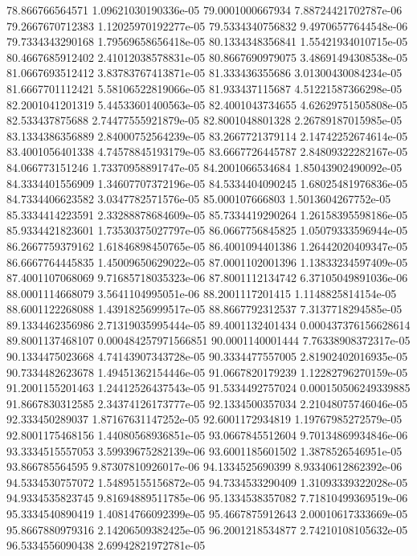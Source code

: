 {78.866766564571 1.09621030190336e-05
79.0001000667934 7.88724421702787e-06
79.2667670712383 1.12025970192277e-05
79.5334340756832 9.49706577644548e-06
79.7334343290168 1.79569658656418e-05
80.1334348356841 1.55421934010715e-05
80.4667685912402 2.41012038578831e-05
80.8667690979075 3.48691494308538e-05
81.0667693512412 3.83783767413871e-05
81.333436355686 3.01300430084234e-05
81.6667701112421 5.58106522819066e-05
81.933437115687 4.51221587366298e-05
82.2001041201319 5.44533601400563e-05
82.4001043734655 4.62629751505808e-05
82.533437875688 2.74477555921879e-05
82.8001048801328 2.26789187015985e-05
83.1334386356889 2.84000752564239e-05
83.2667721379114 2.14742252674614e-05
83.4001056401338 4.74578845193179e-05
83.6667726445787 2.84809322282167e-05
84.066773151246 1.73370958891747e-05
84.2001066534684 1.85043902490092e-05
84.3334401556909 1.34607707372196e-05
84.5334404090245 1.68025481976836e-05
84.7334406623582 3.0347782571576e-05
85.000107666803 1.5013604267752e-05
85.3334414223591 2.33288878684609e-05
85.7334419290264 1.26158395598186e-05
85.9334421823601 1.73530375027797e-05
86.0667756845825 1.05079333596944e-05
86.2667759379162 1.61846898450765e-05
86.4001094401386 1.26442020409347e-05
86.6667764445835 1.45009650629022e-05
87.0001102001396 1.13833234597409e-05
87.4001107068069 9.71685718035323e-06
87.8001112134742 6.37105049891036e-06
88.0001114668079 3.5641104995051e-06
88.2001117201415 1.1148825814154e-05
88.6001122268088 1.43918256999517e-05
88.8667792312537 7.3137718294585e-05
89.1334462356986 2.71319035995444e-05
89.4001132401434 0.000437376156628614
89.8001137468107 0.000484257971566851
90.0001140001444 7.76338908372317e-05
90.1334475023668 4.74143907343728e-05
90.3334477557005 2.81902402016935e-05
90.7334482623678 1.49451362154446e-05
91.0667820179239 1.12282796270159e-05
91.2001155201463 1.24412526437543e-05
91.5334492757024 0.000150506249339885
91.8667830312585 2.34374126173777e-05
92.1334500357034 2.21048075746046e-05
92.333450289037 1.87167631147252e-05
92.6001172934819 1.19767985272579e-05
92.8001175468156 1.44080568936851e-05
93.0667845512604 9.70134869934846e-06
93.3334515557053 3.59939675282139e-06
93.6001185601502 1.3878526546951e-05
93.866785564595 9.87307810926017e-06
94.1334525690399 8.93340612862392e-06
94.5334530757072 1.54895155156872e-05
94.7334533290409 1.31093339322028e-05
94.9334535823745 9.81694889511785e-06
95.1334538357082 7.71810499369519e-06
95.3334540890419 1.40814766092399e-05
95.4667875912643 2.00010617333669e-05
95.8667880979316 2.14206509382425e-05
96.2001218534877 2.74210108105632e-05
96.5334556090438 2.69942821972781e-05
}
